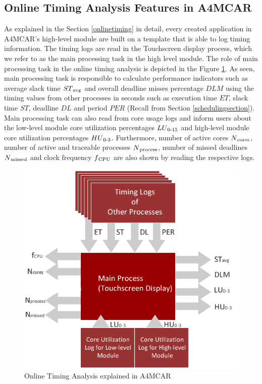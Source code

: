 \subsection{Online Timing Analysis Features in A4MCAR}
As explained in the Section \ref{onlinetiming} in detail, every created application in A4MCAR's high-level module are built on a template that is able to log timing information. The timing logs are read in the Touchscreen display process, which we refer to as the main processing task in the high level module. The role of main processing task in the online timing analysis is depicted in the Figure \ref{fig:a4mcartiming}. As seen, main processing task is responsible to calculate performance indicators such as average slack time ${ST\textsubscript{avg}}$ and overall deadline misses percentage ${DLM}$ using the timing values from other processes in seconds such as execution time ${ET}$, slack time ${ST}$, deadline ${DL}$ and period ${PER}$ (Recall from Section \ref{schedulingsection}). Main processing task can also read from core usage logs and inform users about the low-level module core utilization percentages ${LU\textsubscript{0-15}}$ and high-level module core utilization percentages ${HU\textsubscript{0-3}}$. Furthermore, number of active cores ${N\textsubscript{cores}}$, number of active and traceable processes ${N\textsubscript{process}}$, number of missed deadlines ${N\textsubscript{missed}}$ and clock frequency ${f\textsubscript{CPU}}$ are also shown by reading the respective logs. 
\begin{figure}[!ht]
	\centering
	\captionsetup{justification=centering}
	\includegraphics[scale=0.55]{content/images/a4mcartiming.png}
	\caption{Online Timing Analysis explained in A4MCAR}
	\label{fig:a4mcartiming}
\end{figure}

